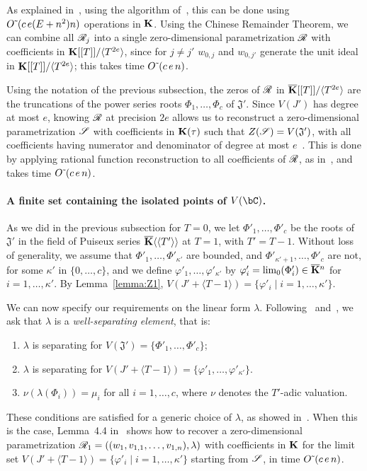 \documentclass[12pt]{article}
\begin{document}
As explained in~\cite[Section~2.2]{SaSc16}, using the algorithm
of~\cite{GiLeSa01}, this can be done using ${O}{\,\tilde{ }\,}(c\,e (E+n^2)n)$
operations in $\mathbf{K}$.  Using the Chinese Remainder Theorem, we can
combine all $\mathscr{R}_{j}$ into a single zero-dimensional parametrization
$\mathscr{R}$ with coefficients in $\mathbf{K}[[T]]/\langle T^{2e}\rangle$, since
for $j\ne j'$ $w_{0,j}$ and $w_{0,j'}$ generate the unit ideal in
$\mathbf{K}[[T]]/\langle T^{2e}\rangle$; this takes time 
${O}{\,\tilde{ }\,}(c\,e\,n)$.

Using the notation of the previous subsection, the zeros of $\mathscr{R}$ in
$\overline{\mathbf{K}}[[T]]/\langle T^{2e}\rangle$ are the truncations of the power
series roots $\Phi_1,\dots,\Phi_c$ of $\mathfrak{J}'$. Since $V(J')$ has
degree at most $e$, knowing $\mathscr{R}$ at precision $2e$ allows us to
reconstruct a zero-dimensional parametrization $\mathscr{S}$ with
coefficients in $\mathbf{K}(\tau)$ such that $Z(\mathscr{S})=V(\mathfrak{J}')$,
with all coefficients having numerator and denominator of degree at
most $e$~\cite[Theorem~1]{Schost03}.  This is done by applying
rational function reconstruction to all coefficients of $\mathscr{R}$, as
in~\cite{Schost03}, and takes time ${O}{\,\tilde{ }\,}(c\,e\,n)$.


\paragraph{A finite set containing the isolated points of $V(\bC)$.}
As we did in the previous subsection for $T=0$, we let
$\Phi'_1,\dots,\Phi'_c$ be the roots of $\mathfrak{J}'$ in the field
of Puiseux series $\overline{\mathbf{K}}\langle\langle T'\rangle\rangle$ at $T=1$,
with $T'=T-1$. Without loss of generality, we assume that
$\Phi'_1,\dots,\Phi'_{\kappa'}$ are bounded, and
$\Phi'_{\kappa'+1},\dots,\Phi'_c$ are not, for some $\kappa'$ in
$\{0,\dots,c\}$, and we define $\varphi'_1,\dots,\varphi'_{\kappa'}$ by
$\varphi'_i=\lim_0(\Phi'_i)\in\overline{\mathbf{K}}{}^n$ for $i=1,\dots,\kappa'$.  By
Lemma~\ref{lemma:Z1},
$V(J' + \langle T-1\rangle) = \{ \varphi'_i \mid i=1,\dots,\kappa'\}$.

We can now specify our requirements on the linear form $\lambda$.
Following~\cite{RRS} and~\cite{SaSc16}, we ask that $\lambda$ is a
{\em well-separating element}, that is:
\begin{enumerate}
\item $\lambda$ is separating for $V(\mathfrak{J}')=\{\Phi'_1,\dots,\Phi'_c\}$;
\item $\lambda$ is separating for $V(J' + \langle T-1\rangle) = \{ \varphi'_1,\dots,\varphi'_{\kappa'}\}$.
\item $\nu(\lambda(\Phi_i)) = \mu_i$ for all $i=1,\dots,c$, where $\nu$ denotes
 the $T'$-adic valuation.
\end{enumerate}
These conditions are satisfied for a generic choice of $\lambda$, as
showed in~\cite{SaSc16}. When this is the case, Lemma~4.4
in~\cite{RRS} shows how to recover a zero-dimensional parametrization
$\mathscr{R}_1=((w_1,v_{1,1},\dots,v_{1,n}),\lambda)$ with coefficients in
$\mathbf{K}$ for the limit set $V(J' + \langle T-1\rangle) =\{\varphi'_i \mid i=1,\dots,{\kappa'}\}$
starting from $\mathscr{S}$, in time 
${O}{\,\tilde{ }\,}(c\,e\,n)$.
\end{document}
